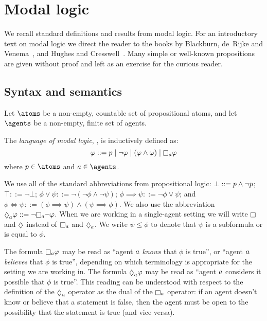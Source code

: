 \section{Modal logic}\label{ml}

We recall standard definitions and results from modal logic.
For an introductory text on modal logic we direct the reader to the books by Blackburn, de~Rijke and Venema~\cite{blackburn:2001}, and Hughes and Cresswell~\cite{hughes:1996}.
Many simple or well-known propositions are given without proof and left as an exercise for the curious reader.

\subsection{Syntax and semantics}

Let $\atoms$ be a non-empty, countable set of propositional atoms, and
let $\agents$ be a non-empty, finite set of agents.

\begin{definition}
The {\em language of modal logic}, \langMl{}, is inductively defined as:
$$
\phi ::= 
    \atomP \mid
    \lnot \phi \mid
    (\phi \land \phi) \mid
    \necessaryA \phi
$$
where $\atomP \in \atoms$ and $\agentA \in \agents$.
\end{definition}

We use all of the standard abbreviations from propositional logic:
$\bot ::= p \land \lnot p$;
$\top ::= \lnot \bot$;
$\phi \lor \psi ::= \lnot (\lnot \phi \land \lnot \psi)$;
$\phi \implies \psi ::= \lnot \phi \lor \psi$; and
$\phi \iff \psi ::= (\phi \implies \psi) \land (\psi \implies \phi)$.
We also use the abbreviation $\possibleA \phi ::= \lnot \necessaryA \lnot \phi$.
When we are working in a single-agent setting we will write $\necessary$ and $\possible$ instead of $\necessaryA$ and $\possibleA$.
We write $\psi \leq \phi$ to denote that $\psi$ is a subformula or is equal to $\phi$.

The formula $\necessaryA \phi$ may be read as ``agent $a$ {\em knows} that $\phi$ is true'', or ``agent $a$ {\em believes} that $\phi$ is true'', depending on which terminology is appropriate for the setting we are working in.
The formula $\possibleA \phi$ may be read as ``agent $a$ considers it possible that $\phi$ is true''.
This reading can be understood with respect to the definition of the $\possibleA$ operator as the dual of the $\necessaryA$ operator: if an agent doesn't know or believe that a statement is false, then the agent must be open to the possibility that the statement is true (and vice versa).

